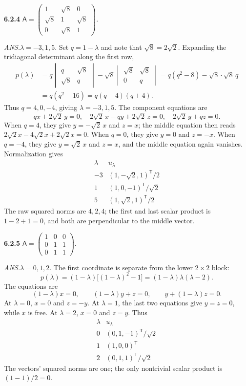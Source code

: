 \par\bigskip
\noindent\textbf{6.2.4}\quad
$\mathsf{A}=\begin{pmatrix}1&\sqrt{8}&0\\\sqrt{8}&1&\sqrt{8}\\
0&\sqrt{8}&1\end{pmatrix}$.
\par\nobreak\hfill\emph{ANS.}\enspace $\lambda=-3,1,5$.
\solution
Set $q=1-\lambda$ and note that $\sqrt8=2\sqrt2$.
Expanding the tridiagonal determinant along the first row,
\begin{align*}
p(\lambda)
&=q\begin{vmatrix}q&\sqrt8\\\sqrt8&q\end{vmatrix}
-\sqrt8\begin{vmatrix}\sqrt8&\sqrt8\\0&q\end{vmatrix}
=q(q^2-8)-\sqrt8\cdot\sqrt8\,q\\
&=q(q^2-16)=q(q-4)(q+4).
\end{align*}
Thus $q=4,0,-4$, giving $\lambda=-3,1,5$. The component equations are
\[
qx+2\sqrt2\,y=0,\quad
2\sqrt2\,x+qy+2\sqrt2\,z=0,\quad
2\sqrt2\,y+qz=0.
\]
When $q=4$, they give $y=-\sqrt2\,x$ and $z=x$; the middle equation
then reads $2\sqrt2 x-4\sqrt2 x+2\sqrt2 x=0$.
When $q=0$, they give $y=0$ and $z=-x$.
When $q=-4$, they give $y=\sqrt2\,x$ and $z=x$, and the middle
equation again vanishes. Normalization gives
\[
\boxed{\begin{array}{c|c}
\lambda&u_\lambda\\\hline
-3&(1,-\sqrt2,1)^{\mathsf T}/2\\
1&(1,0,-1)^{\mathsf T}/\sqrt2\\
5&(1,\sqrt2,1)^{\mathsf T}/2
\end{array}}
\]
The raw squared norms are $4,2,4$; the first and last scalar product
is $1-2+1=0$, and both are perpendicular to the middle vector.

\par\bigskip
\noindent\textbf{6.2.5}\quad
$\mathsf{A}=\begin{pmatrix}1&0&0\\0&1&1\\0&1&1\end{pmatrix}$.
\par\nobreak\hfill\emph{ANS.}\enspace $\lambda=0,1,2$.
\solution
The first coordinate is separate from the lower $2\times2$ block:
\[
p(\lambda)=(1-\lambda)\bigl[(1-\lambda)^2-1\bigr]
=(1-\lambda)\lambda(\lambda-2).
\]
The equations are
\[
(1-\lambda)x=0,\qquad(1-\lambda)y+z=0,\qquad
y+(1-\lambda)z=0.
\]
At $\lambda=0$, $x=0$ and $z=-y$. At $\lambda=1$, the last two
equations give $y=z=0$, while $x$ is free. At $\lambda=2$, $x=0$
and $z=y$. Thus
\[
\boxed{\begin{array}{c|c}
\lambda&u_\lambda\\\hline
0&(0,1,-1)^{\mathsf T}/\sqrt2\\
1&(1,0,0)^{\mathsf T}\\
2&(0,1,1)^{\mathsf T}/\sqrt2
\end{array}}
\]
The vectors' squared norms are one; the only nontrivial scalar product
is $(1-1)/2=0$.

